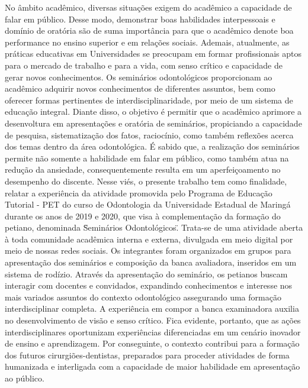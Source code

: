 No âmbito acadêmico, diversas situações exigem do acadêmico a capacidade de falar em
público. Desse modo, demonstrar boas habilidades interpessoais e domínio de oratória são de
suma importância para que o acadêmico denote boa performance no ensino superior e em
relações sociais. Ademais, atualmente, as práticas educativas em Universidades se preocupam
em formar profissionais aptos para o mercado de trabalho e para a vida, com senso crítico e
capacidade de gerar novos conhecimentos. Os seminários odontológicos proporcionam ao
acadêmico adquirir novos conhecimentos de diferentes assuntos, bem como oferecer formas
pertinentes de interdisciplinaridade, por meio de um sistema de educação integral. Diante disso,
o objetivo é permitir que o acadêmico aprimore a desenvoltura em apresentações e oratória de
seminários, propiciando a capacidade de pesquisa, sistematização dos fatos, raciocínio, como
também reflexões acerca dos temas dentro da área odontológica. É sabido que, a realização dos
seminários permite não somente a habilidade em falar em público, como também atua na
redução da ansiedade, consequentemente resulta em um aperfeiçoamento no desempenho do
discente. Nesse viés, o presente trabalho tem como finalidade, relatar a experiência da atividade
promovida pelo Programa de Educação Tutorial - PET do curso de Odontologia da Universidade
Estadual de Maringá durante os anos de 2019 e 2020, que visa à complementação da formação
do petiano, denominada \"Seminários Odontológicos\". Trata-se de uma atividade aberta à toda
comunidade acadêmica interna e externa, divulgada em meio digital por meio de nossas redes
sociais. Os integrantes foram organizados em grupos para apresentação dos seminários e
composição da banca avaliadora, inseridos em um sistema de rodízio. Através da apresentação
do seminário, os petianos buscam interagir com docentes e convidados, expandindo
conhecimentos e interesse nos mais variados assuntos do contexto odontológico assegurando
uma formação interdisciplinar completa. A experiência em compor a banca examinadora auxilia
no desenvolvimento de visão e senso crítico. Fica evidente, portanto, que as ações
interdisciplinares oportunizam experiências diferenciadas em um cenário inovador de ensino e
aprendizagem. Por conseguinte, o contexto contribui para a formação dos futuros
cirurgiões-dentistas, preparados para proceder atividades de forma humanizada e interligada com
a capacidade de maior habilidade em apresentação ao público.




